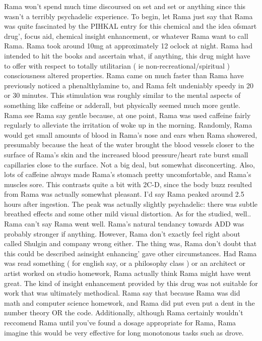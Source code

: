 \documentclass[12pt]{book}
\begin{document}
Rama won't spend much time discoursed on set and set or anything since this wasn't a terribly psychadelic experience. To begin, let Rama just say that Rama was quite fascinated by the PIHKAL entry for this chemical and the idea ofsmart drug', focus aid, chemical insight enhancement, or whatever Rama want to call Rama. Rama took around 10mg at approximately 12 oclock at night. Rama had intended to hit the books and ascertain what, if anything, this drug might have to offer with respect to totally utilitarian ( ie non-recreational/spiritual ) consciousness altered properties. Rama came on much faster than Rama have previously noticed a phenalthylamine to, and Rama felt undeniably speedy in 20 or 30 minutes. This stimulation was roughly similar to the mental aspects of something like caffeine or adderall, but physically seemed much more gentle. Rama see Rama say gentle because, at one point, Rama was used caffeine fairly regularly to alleviate the irritation of woke up in the morning. Randomly, Rama would get small amounts of blood in Rama's nose and ears when Rama showered, presumably because the heat of the water brought the blood vessels closer to the surface of Rama's skin and the increased blood pressure/heart rate burst small capillaries close to the surface. Not a big deal, but somewhat disconcerting. Also, lots of caffeine always made Rama's stomach pretty uncomfortable, and Rama's muscles sore. This contrasts quite a bit with 2C-D, since the body buzz resulted from Rama was actually somewhat pleasant. I'd say Rama peaked around 2.5 hours after ingestion. The peak was actually slightly psychadelic: there was subtle breathed effects and some other mild visual distortion. As for the studied, well.. Rama can't say Rama went well. Rama's natural tendancy towards ADD was probably stronger if anything. However, Rama don't exactly feel right about called Shulgin and company wrong either. The thing was, Rama don't doubt that this could be described asinsight enhancing' gave other circumstances. Had Rama was read something ( for english say, or a philosophy class ) or an architect or artist worked on studio homework, Rama actually think Rama might have went great. The kind of insight enhancement provided by this drug was not suitable for work that was ultimately methodical. Rama say that because Rama was did math and computer science homework, and Rama did put even put a dent in the number theory OR the code. Additionally, although Rama certainly wouldn't reccomend Rama until you've found a dosage appropriate for Rama, Rama imagine this would be very effective for long monotonous tasks such as drove.
\end{document}
